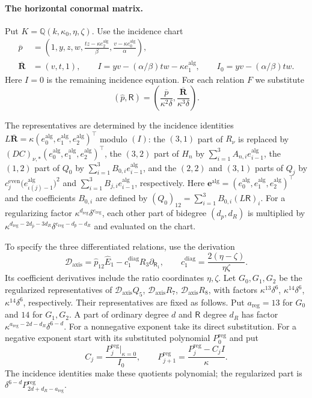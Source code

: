 \documentclass[11pt,a4paper]{article}
\numberwithin{equation}{section}
\theoremstyle{plain}
\theoremstyle{definition}
\theoremstyle{remark}
\begin{document}
\paragraph{The horizontal conormal matrix.}
Put $K=\mathbb Q(k,\kappa_0,\eta,\zeta)$. Use the incidence chart
\[
\begin{aligned}
 \overline p&=\left(1,y,z,w,
            \frac{tz-\kappa e_2^{\mathrm{alg}}}{\beta},
            \frac{v-\kappa e_0^{\mathrm{alg}}}{\alpha}\right),\\
 \overline{\boldsymbol R}&=(v,t,1),\qquad
 I=yv-(\alpha/\beta) tw-\kappa e_1^{\mathrm{alg}},\qquad I_0=yv-(\alpha/\beta) tw.
\end{aligned}
\]
Here $I=0$ is the remaining incidence equation. For each relation
$F$ we substitute
\[
 (\widehat p,\mathsf R)
   =\left(\frac{\overline p}{\kappa^2\delta},
          \frac{\overline{\boldsymbol R}}{\kappa^3\delta}\right).
\]

The representatives are determined by the incidence identities
$L\overline{\boldsymbol R}=\kappa(e_0^{\mathrm{alg}},e_1^{\mathrm{alg}},e_2^{\mathrm{alg}})^\top$ modulo $(I)$:
the $(3,1)$ part of $R_\nu$ is replaced by $(DC)_{\nu,*}(e_0^{\mathrm{alg}},e_1^{\mathrm{alg}},e_2^{\mathrm{alg}})^\top$,
the $(3,2)$ part of $H_n$ by $\sum_{i=1}^3 A_{n,i}e_{i-1}^{\mathrm{alg}}$,
the $(1,2)$ part of $Q_0$ by $\sum_{i=1}^3 B_{0,i}e_{i-1}^{\mathrm{alg}}$,
and the $(2,2)$ and $(3,1)$ parts of $Q_j$ by
$c_j^{\mathrm{even}}\bigl(e_{\iota(j)-1}^{\mathrm{alg}}\bigr)^2$ and
$\sum_{i=1}^3 B_{j,i}e_{i-1}^{\mathrm{alg}}$, respectively. Here
$\boldsymbol e^{\mathrm{alg}}=(e_0^{\mathrm{alg}},e_1^{\mathrm{alg}},e_2^{\mathrm{alg}})^\top$ and the coefficients $B_{0,i}$ are defined by
$(Q_0)_{12}=\sum_{i=1}^3B_{0,i}(L\mathsf R)_i$.
For a regularizing factor $\kappa^{d_{\mathrm{reg}}}\delta^{e_{\mathrm{reg}}}$,
each other part of bidegree $(d_{\widehat p},d_R)$ is multiplied by
$\kappa^{d_{\mathrm{reg}}-2d_{\widehat p}-3d_R}
 \delta^{e_{\mathrm{reg}}-d_{\widehat p}-d_R}$ and evaluated on the chart.

To specify the three differentiated relations, use the derivation
\[
 \mathcal D_{\mathrm{axis}}=\widehat p_{12}\widehat E_1
              -c_1^{\mathrm{diag}}R_3\partial_{\mathsf R_1},
 \qquad c_1^{\mathrm{diag}}=\frac{2(\eta-\zeta)}{\eta\zeta}.
\]
Its coefficient derivatives include the ratio coordinates $\eta,\zeta$.
Let $G_0,G_1,G_2$ be the regularized representatives of
$\mathcal D_{\mathrm{axis}}Q_5$, $\mathcal D_{\mathrm{axis}}R_7$, $\mathcal D_{\mathrm{axis}}R_8$, with factors
$\kappa^{13}\delta^6$, $\kappa^{14}\delta^6$,
$\kappa^{14}\delta^6$, respectively. Their representatives are
fixed as follows. Put $a_{\mathrm{reg}}=13$ for $G_0$ and $14$ for
$G_1,G_2$. A part of ordinary degree $d$ and $\mathsf R$ degree $d_R$
has factor $\kappa^{a_{\mathrm{reg}}-2d-d_R}\delta^{6-d}$.
For a nonnegative exponent take its direct substitution. For a negative
exponent start with its substituted polynomial $P_0^{\mathrm{reg}}$ and put
\[
 C_j=\frac{P_j^{\mathrm{reg}}|_{\kappa=0}}{I_0},\qquad
 P_{j+1}^{\mathrm{reg}}=\frac{P_j^{\mathrm{reg}}-C_jI}{\kappa}.
\]
The incidence identities make these quotients polynomial; the
regularized part is $\delta^{6-d}P_{2d+d_R-a_{\mathrm{reg}}}^{\mathrm{reg}}$.
\end{document}
